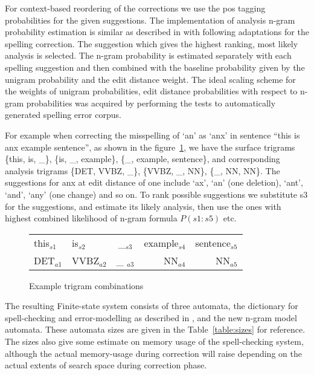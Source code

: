 \documentclass{llncs}
\begin{document}
For context-based reordering of the corrections we use the pos tagging
probabilities for the given suggestions. The implementation of analysis n-gram
probability estimation is similar as described in \cite{silfverberg/2011} with
following adaptations for the spelling correction. The suggestion which gives
the highest ranking, most likely analysis is selected.  The n-gram probability
is estimated separately with each spelling suggestion and then combined with
the baseline probability given by the unigram probability and the edit distance
weight. The ideal scaling scheme for the weights of unigram probabilities,
edit distance probabilities with respect to n-gram probabilities was acquired
by performing the tests to automatically generated spelling error corpus.

For example when correcting the misspelling of `an' as `anx' in sentence ``this
is anx example sentence'', as shown in the figure~\ref{fig:example}, we have
the surface trigrams \{this, is, \_\}, \{is, \_, example\}, \{\_, example,
sentence\}, and corresponding analysis trigrams \{DET, VVBZ, \_\}, \{VVBZ, \_,
NN\}, \{\_, NN, NN\}. The suggestions for anx at edit distance of one include
`ax', `an' (one deletion), `ant', `and', `any' (one change) and so on. To rank
possible suggestions we substitute s3 for the suggestions, and estimate its
likely analysis, then use the ones with highest combined likelihood of n-gram
formula $P(s1:s5)$ etc.

\begin{figure}[h]
\begin{centering}
\caption{Example trigram combinations\label{fig:example}}
\begin{scriptsize}
\begin{tabular}{llcrr}
\hline
this$_{s1}$ & is$_{s2}$ & \_$_{s3}$ & example$_{s4}$ & sentence$_{s5}$\\
DET$_{a1}$ & VVBZ$_{a2}$ & \_ $_{a3}$& NN$_{a4}$ & NN$_{a5}$\\
\hline
\end{tabular}
\end{scriptsize}
\end{centering}
\end{figure}

The resulting Finite-state system consists of three automata, the dictionary
for spell-checking and error-modelling as described in
\cite{pirinen/2010/lrec}, and the new n-gram model automata. These automata
sizes are given in the Table~\ref{table:sizes} for reference. The sizes also
give some estimate on memory usage of the spell-checking system, although the
actual memory-usage during correction will raise depending on the actual
extents of search space during correction phase.
\end{document}
